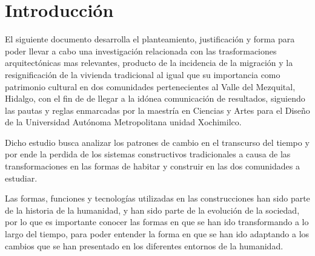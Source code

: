 \section{Introducción}


El siguiente documento desarrolla el planteamiento, justificación y forma para poder llevar a cabo una investigación relacionada con las trasformaciones arquitectónicas mas relevantes, producto de la incidencia de la migración y la resignificación de la vivienda tradicional al igual que su importancia como patrimonio cultural en dos comunidades pertenecientes al Valle del Mezquital, Hidalgo, con el fin de de llegar a la idónea comunicación de resultados, siguiendo las pautas y reglas enmarcadas por la maestría en Ciencias y Artes para el Diseño de la Universidad Autónoma Metropolitana unidad Xochimilco.

Dicho estudio busca analizar los patrones de cambio en el transcurso del tiempo y por ende la perdida de los sistemas constructivos tradicionales a causa de las transformaciones en las formas de habitar y construir en las dos comunidades a estudiar.

Las formas, funciones y tecnologías utilizadas en las construcciones han sido parte de la historia de la humanidad, y han sido parte de la evolución de la sociedad, por lo que es importante conocer las formas en que se han ido transformando a lo largo del tiempo, para poder entender la forma en que se han ido adaptando a los cambios que se han presentado en los diferentes entornos de la humanidad.
